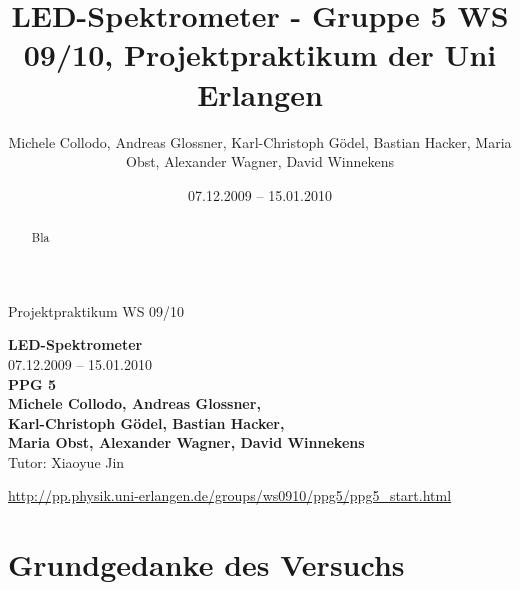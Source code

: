\documentclass[11pt]{scrartcl}
\title{LED-Spektrometer - Gruppe 5 WS 09/10, Projektpraktikum der Uni Erlangen}
\date{07.12.2009 -- 15.01.2010}
\author{Michele Collodo, Andreas Glossner, Karl-Christoph G\"odel, Bastian Hacker, Maria Obst, Alexander Wagner, David Winnekens}
\begin{document}
\sloppy %
\thispagestyle{empty}
\large{Projektpraktikum WS 09/10}
\hfill
{}
\\[8\baselineskip]
\begin{center}
{\fontsize{36}{54}\textbf{LED-Spektrometer}}
\\[2\baselineskip]
{\Large 07.12.2009 -- 15.01.2010}
\\[7\baselineskip]
{\huge\textbf{PPG 5}}
\\[0.5\baselineskip]
{\large\textbf{
Michele Collodo,
Andreas Glossner,\\
Karl-Christoph G\"odel,
Bastian Hacker,\\
Maria Obst,
Alexander Wagner,
David Winnekens}\\
Tutor: Xiaoyue Jin}
\vfill



\small{\url{http://pp.physik.uni-erlangen.de/groups/ws0910/ppg5/ppg5\_start.html}}
\end{center}
\newpage



\tableofcontents
\vfill



\begin{abstract}
Bla
\end{abstract}
\newpage


\section{Grundgedanke des Versuchs}
\end{document}
